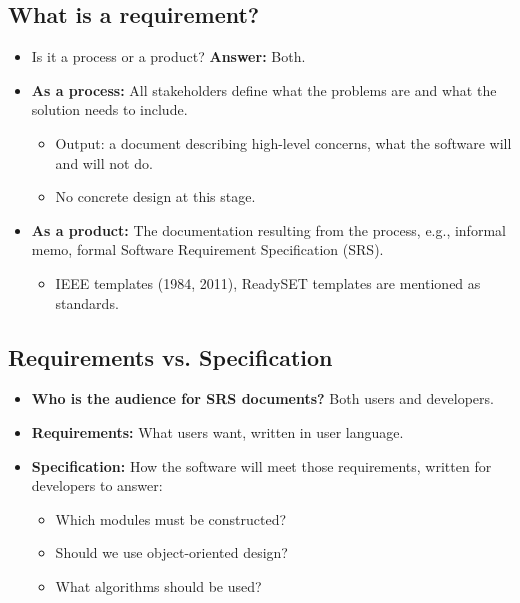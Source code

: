 \documentclass[11pt,a4paper]{article}
\begin{document}
\subsection*{What is a requirement?}
\begin{itemize}
    \item Is it a process or a product? \textbf{Answer:} Both.
    \item \textbf{As a process:} All stakeholders define what the problems are and what the solution needs to include.
        \begin{itemize}
            \item Output: a document describing high-level concerns, what the software will and will not do.
            \item No concrete design at this stage.
        \end{itemize}
    \item \textbf{As a product:} The documentation resulting from the process, e.g., informal memo, formal Software Requirement Specification (SRS).
        \begin{itemize}
            \item IEEE templates (1984, 2011), ReadySET templates are mentioned as standards.
        \end{itemize}
\end{itemize}

\subsection*{Requirements vs. Specification}
\begin{itemize}
    \item \textbf{Who is the audience for SRS documents?} Both users and developers.
    \item \textbf{Requirements:} What users want, written in user language.
    \item \textbf{Specification:} How the software will meet those requirements, written for developers to answer:
        \begin{itemize}
            \item Which modules must be constructed?
            \item Should we use object-oriented design?
            \item What algorithms should be used?
        \end{itemize}
\end{itemize}
\end{document}
